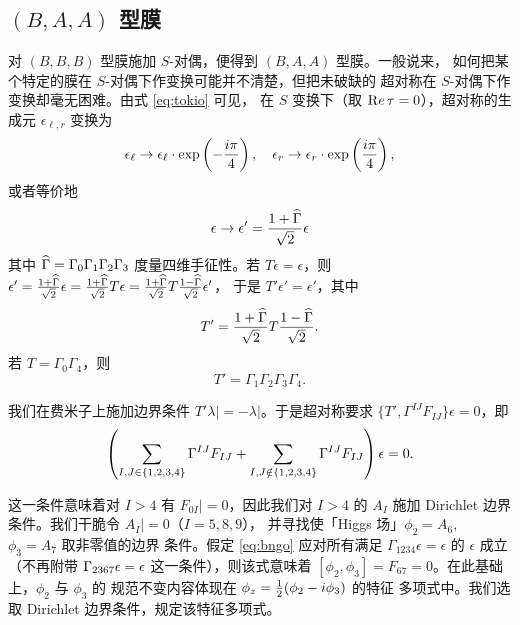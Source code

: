 \subsection{$(B,A,A)$ 型膜}

对 $(B,B,B)$ 型膜施加 $S$-对偶，便得到 $(B,A,A)$ 型膜。一般说来，
如何把某个特定的膜在 $S$-对偶下作变换可能并不清楚，但把未破缺的
超对称在 $S$-对偶下作变换却毫无困难。由式 \eqref{eq:tokio} 可见，
在 $S$ 变换下（取 ${\rm Re}\,\tau=0$），超对称的生成元 $\epsilon_{\ell,r}$
变换为 %
\setcounter{equation}{19}
\begin{equation}\label{eq:bilj}
\epsilon_\ell\to
\epsilon_\ell\cdot\exp\left(-{i\pi\over 4}\right),\quad
\epsilon_r\to \epsilon_r\cdot\exp\left({i\pi\over 4}\right),
\end{equation}
 或者等价地 %
\setcounter{equation}{20}
\begin{equation}\label{eq:yogo}
\epsilon\to\epsilon'={1+\HG\over \sqrt
2}\epsilon
\end{equation}
 其中 $\HG=\Gamma_0\Gamma_1\Gamma_2\Gamma_3$ 度量四维手征性。若
$T\epsilon=\epsilon$，则
$\epsilon'={1+\HG\over \sqrt 2}\epsilon={1+\HG\over \sqrt
2}T\epsilon={1+\HG\over \sqrt 2}T{1-\HG\over \sqrt 2}\epsilon'$，
于是 $T'\epsilon'=\epsilon'$，其中 %
\setcounter{equation}{21}
\begin{equation}\label{eq:uvuf}
T'={1+\HG\over \sqrt
2}T{1-\HG\over \sqrt 2}.
\end{equation}
 若 $T=\Gamma_0\Gamma_4$，则
\setcounter{equation}{22}
\begin{equation}\label{eq:polyo}
T'=\Gamma_1\Gamma_2\Gamma_3\Gamma_4.
\end{equation}

我们在费米子上施加边界条件 $T'\lambda|=-\lambda|$。于是超对称要求
$\{T',\Gamma^{IJ}F_{IJ}\}\epsilon=0$，即
\setcounter{equation}{23}
\begin{equation}\label{eq:bngo}
\left(\sum_{I,J\in
\{1,2,3,4\}}\Gamma^{IJ}F_{IJ}+\sum_{I,J\notin
\{1,2,3,4\}}\G^{IJ}F_{IJ}\right)\epsilon=0.
\end{equation}

这一条件意味着对 $I>4$ 有 $F_{0I}|=0$，因此我们对 $I>4$ 的 $A_I$
施加 Dirichlet 边界条件。我们干脆令 $A_I\vert=0$（$I=5,8,9$），
并寻找使「Higgs 场」$\phi_2=A_6,$ $\phi_3=A_7$ 取非零值的边界
条件。假定 \eqref{eq:bngo} 应对所有满足
$\Gamma_{1234}\epsilon=\epsilon$ 的 $\epsilon$ 成立（不再附带
$\G_{2367}\epsilon=\epsilon$ 这一条件），则该式意味着
$[\phi_2,\phi_3]=F_{67}=0$。在此基础上，$\phi_2$ 与 $\phi_3$ 的
规范不变内容体现在 $\phi_z={1\over 2}(\phi_2-i\phi_3)$ 的特征
多项式中。我们选取 Dirichlet 边界条件，规定该特征多项式。

